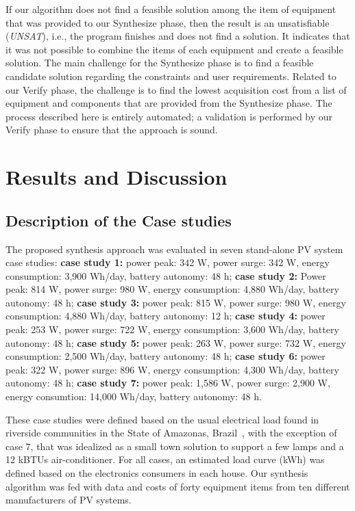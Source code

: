 \documentclass[runningheads]{llncs}
\begin{document}
If our algorithm does not find a feasible solution among the item of equipment that was provided to our {\sc Synthesize} phase, then the result is an unsatisfiable (\textit{UNSAT}), i.e., the program finishes and does not find a solution. It indicates that it was not possible to combine the items of each equipment and create a feasible solution. The main challenge for the {\sc Synthesize} phase is to find a feasible candidate solution regarding the constraints and user requirements. Related to our {\sc Verify} phase, the challenge is to find the lowest acquisition cost from a list of equipment and components that are provided from the {\sc Synthesize} phase. 
The process described here is entirely automated; a validation is performed by our {\sc Verify} phase to ensure that the approach is sound.

\section{Results and Discussion}
\subsection{Description of the Case studies}
The proposed synthesis approach was evaluated in  seven stand-alone PV system case studies: 
\textbf{case study 1:} power peak: 342 W, power surge: 342 W, energy consumption: 3,900 Wh/day, battery autonomy: 48 h; \textbf{case study 2:} Power peak: 814 W, power surge: 980 W, energy consumption: 4,880 Wh/day, battery autonomy: 48 h; \textbf{case study 3:} power peak: 815 W, power surge: 980 W, energy consumption: 4,880 Wh/day, battery autonomy: 12 h; \textbf{case study 4:} power peak: 253 W, power surge: 722 W, energy consumption: 3,600 Wh/day, battery autonomy: 48 h; \textbf{case study 5:} power peak: 263 W, power surge: 732 W, energy consumption: 2,500 Wh/day, battery autonomy: 48 h; \textbf{case study 6:} power peak: 322 W, power surge: 896 W, energy consumption: 4,300 Wh/day, battery autonomy: 48 h; \textbf{case study 7:} power peak: 1,586 W, power surge: 2,900 W, energy consumtion: 14,000 Wh/day, battery autonomy: 48 h.

These case studies were defined based on the usual electrical load found in riverside communities in the State of Amazonas,  Brazil~\cite{TrindadeCordeiro19,Agrener2013}, with the exception of case 7, that was idealized as a small town solution to support a few lamps and a 12 kBTUs air-conditioner. For all cases, an estimated load curve (kWh) was defined based on the electronics consumers in each house. Our synthesis algorithm was fed with data and costs of forty equipment items from ten different manufacturers of PV systems. 
\end{document}
